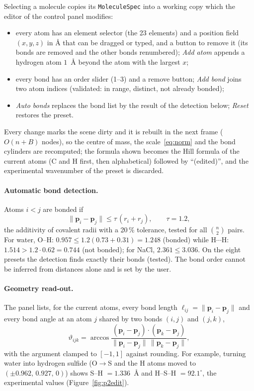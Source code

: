 \documentclass[a4paper, 11pt]{article}
\newcommand{\code}[1]{\texttt{#1}}
\begin{document}
Selecting a molecule copies its \code{MoleculeSpec} into a working copy which the editor of the control panel modifies:
\begin{itemize}
  \item every atom has an element selector (the 23 elements) and a position field $(x,y,z)$ in {\AA} that can be dragged or typed, and a
        button to remove it (its bonds are removed and the other bonds renumbered); \emph{Add atom} appends a hydrogen atom $1$~{\AA} beyond the
        atom with the largest $x$;
  \item every bond has an order slider (1--3) and a remove button; \emph{Add bond} joins two atom indices (validated: in range, distinct, not already bonded);
  \item \emph{Auto bonds} replaces the bond list by the result of the detection below; \emph{Reset} restores the preset.
\end{itemize}
Every change marks the scene dirty and it is rebuilt in the next frame ($O(n+B)$ nodes), so the centre of mass, the scale~\eqref{eq:norm} and the
bond cylinders are recomputed; the formula shown becomes the Hill formula of the current atoms (C and H first, then alphabetical) followed by
``(edited)'', and the experimental wavenumber of the preset is discarded.

\paragraph{Automatic bond detection.} Atoms $i<j$ are bonded if
\[
  \|\mathbf p_i-\mathbf p_j\|\le\tau\,(r_i+r_j),\qquad \tau=1.2,
\]
the additivity of covalent radii with a 20\,\% tolerance, tested for all $\binom n2$ pairs. For water, O--H: $0.957\le1.2(0.73+0.31)=1.248$ (bonded)
while H$\cdots$H: $1.514>1.2\cdot0.62=0.744$ (not bonded); for NaCl, $2.361\le3.036$. On the eight presets the detection finds exactly their bonds
(tested). The bond order cannot be inferred from distances alone and is set by the user.

\paragraph{Geometry read-out.} The panel lists, for the current atoms, every bond length $\ell_{ij}=\|\mathbf p_i-\mathbf p_j\|$ and every bond angle
at an atom $j$ shared by two bonds $(i,j)$ and $(j,k)$,
\[
  \vartheta_{ijk}=\arccos\frac{(\mathbf p_i-\mathbf p_j)\cdot(\mathbf p_k-\mathbf p_j)}{\|\mathbf p_i-\mathbf p_j\|\,\|\mathbf p_k-\mathbf p_j\|},
\]
with the argument clamped to $[-1,1]$ against rounding. For example, turning water into hydrogen sulfide (O$\to$S and the H atoms moved to
$(\pm0.962,\,0.927,\,0)$) shows S--H $=1.336$~{\AA} and H--S--H $=92.1^\circ$, the experimental values (Figure~\ref{fig:p2edit}).
\end{document}

